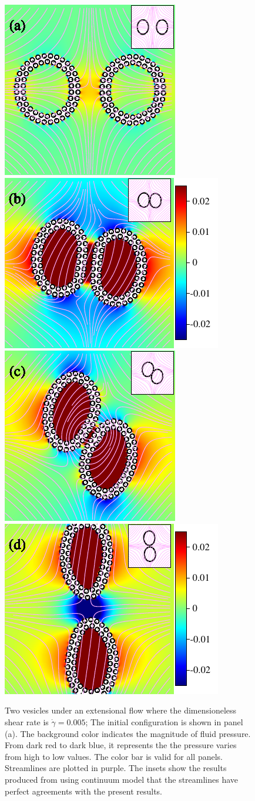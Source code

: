 \documentclass[lineno]{jfm}
\begin{document}
\begin{figure}
\centering
\includegraphics[height=2.in]{N116_ext_0.pdf}
\includegraphics[height=2.in]{N116_ext_2000.pdf}\\
\includegraphics[height=2.in]{N116_ext_4000.pdf}
\includegraphics[height=2.in]{N116_ext_6500.pdf}
  \caption{Two vesicles under an extensional flow where the dimensioneless shear rate is $\dot\gamma=0.005$; The initial configuration is shown in panel (a). The background color indicates the magnitude of fluid pressure. From dark red to dark blue, it represents the the pressure varies from high to low values. The color bar is valid for all panels. Streamlines are plotted in purple. The insets show the results produced from using continuum model that the streamlines have perfect agreements with the present results.
  }
    \label{figure8}
\end{figure}
\end{document}
